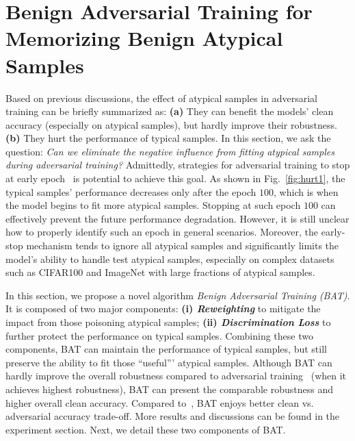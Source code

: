 \vspace{-0.4cm}
\section{Benign Adversarial Training for Memorizing Benign Atypical Samples}
\vspace{-0.2cm}
Based on previous discussions, the effect of atypical samples in adversarial training can be briefly summarized as: 
\textbf{(a)} They can benefit the models' clean accuracy (especially on atypical samples), but hardly improve their robustness. \textbf{(b)} They hurt the performance of typical samples. 
In this section, we ask the question: \textit{Can we eliminate the negative influence from fitting atypical samples during adversarial training?} Admittedly, strategies for adversarial training to stop at early epoch~\cite{rice2020overfitting} is potential to achieve this goal. As shown in Fig.~\ref{fig:hurt1}, the typical samples' performance decreases only after the epoch $100$, which is when the model begins to fit more atypical samples. Stopping at such epoch $100$ can effectively prevent the future performance degradation.
However, it is still unclear how to properly identify such an epoch in general scenarios.
Moreover, the early-stop mechanism tends to ignore all atypical samples and significantly limits the model's ability to handle test atypical samples, especially on complex datasets such as CIFAR100 and ImageNet with large fractions of atypical samples.

In this section, we propose a novel algorithm \textit{Benign Adversarial Training (BAT)}. It is composed of two major components: \textbf{(i) \textit{Reweighting}} to mitigate the impact from those poisoning atypical samples;
\textbf{(ii) \textit{Discrimination Loss}} to further protect the performance on typical samples. Combining these two components, BAT can maintain the performance of typical samples, but still preserve the ability to fit those ``useful''' atypical samples. 
Although BAT can hardly improve the overall robustness compared to adversarial training~\cite{madry2017towards} (when it achieves highest robustness), BAT can present the comparable robustness and higher overall clean accuracy. Compared to~\cite{madry2017towards}, BAT enjoys better clean vs. adversarial accuracy trade-off. More results and discussions can be found in the experiment section. Next, we detail these two components of BAT.

\vspace{-0.2cm}
